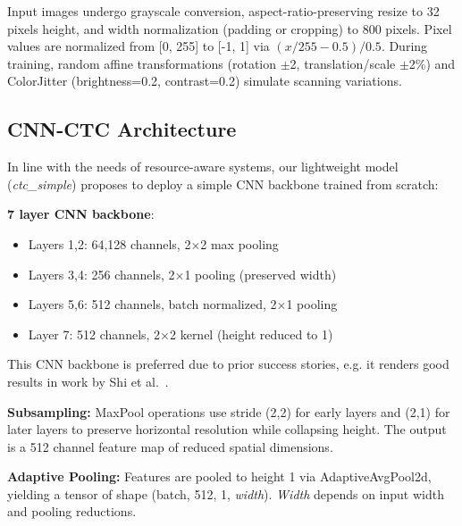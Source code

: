 \documentclass[conference]{IEEEtran}
\newcommand{\preprocessingImgWidth}{800}
\newcommand{\imageHeight}{32}
\begin{document}
Input images undergo grayscale conversion, aspect-ratio-preserving resize to \imageHeight{} pixels height, and width normalization (padding or cropping) to \preprocessingImgWidth{} pixels. Pixel values are normalized from [0, 255] to [-1, 1] via $(x/255 - 0.5) / 0.5$. During training, random affine transformations (rotation $\pm$2\textdegree, translation/scale $\pm$2\%) and ColorJitter (brightness=0.2, contrast=0.2) simulate scanning variations.

\subsection{CNN-CTC Architecture}
\label{subsec:cnn_ctc}

In line with the needs of resource-aware systems, our lightweight model (\textit{ctc\_simple}) proposes to deploy a simple CNN backbone trained from scratch:

\textbf{7 layer CNN backbone}:
\begin{itemize}
    \item Layers 1,2: 64,128 channels, 2$\times$2 max pooling
    \item Layers 3,4: 256 channels, 2$\times$1 pooling (preserved width)
    \item Layers 5,6: 512 channels, batch normalized, 2$\times$1 pooling
    \item Layer 7: 512 channels, 2$\times$2 kernel (height reduced to 1)

\end{itemize}

This CNN backbone is preferred due to prior success stories, e.g. it renders good results in work by Shi et al.~\cite{shi2017crnn}. 

\textbf{Subsampling:} MaxPool operations use stride (2,2) for early layers and (2,1) for later layers to preserve horizontal resolution while collapsing height. The output is a 512 channel feature map of reduced spatial dimensions.

\textbf{Adaptive Pooling:} Features are pooled to height 1 via AdaptiveAvgPool2d, yielding a tensor of shape (batch, 512, 1, \textit{width}). \textit{Width} depends on input width and pooling reductions.
\end{document}
